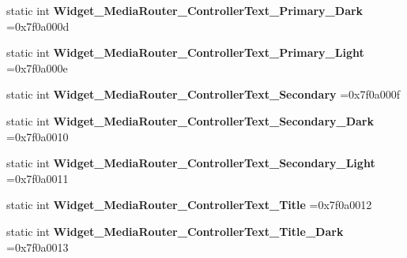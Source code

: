 \begin{DoxyCompactItemize}
\item 
\mbox{\label{classandroid_1_1support_1_1v7_1_1cardview_1_1R_1_1style_a1cf2b189e1316c2f56e93f2bbc734668}} 
static int {\bfseries Widget\+\_\+\+Media\+Router\+\_\+\+Controller\+Text\+\_\+\+Primary\+\_\+\+Dark} =0x7f0a000d
\item 
\mbox{\label{classandroid_1_1support_1_1v7_1_1cardview_1_1R_1_1style_a706d5a6d2ba723b1fabc963287485143}} 
static int {\bfseries Widget\+\_\+\+Media\+Router\+\_\+\+Controller\+Text\+\_\+\+Primary\+\_\+\+Light} =0x7f0a000e
\item 
\mbox{\label{classandroid_1_1support_1_1v7_1_1cardview_1_1R_1_1style_ab57493ccd07e53c02f600a47be8ddde4}} 
static int {\bfseries Widget\+\_\+\+Media\+Router\+\_\+\+Controller\+Text\+\_\+\+Secondary} =0x7f0a000f
\item 
\mbox{\label{classandroid_1_1support_1_1v7_1_1cardview_1_1R_1_1style_acbeb67b82760feaa7bbdbc502a3b2758}} 
static int {\bfseries Widget\+\_\+\+Media\+Router\+\_\+\+Controller\+Text\+\_\+\+Secondary\+\_\+\+Dark} =0x7f0a0010
\item 
\mbox{\label{classandroid_1_1support_1_1v7_1_1cardview_1_1R_1_1style_a3e53e66d7527d064a8c5fef750870936}} 
static int {\bfseries Widget\+\_\+\+Media\+Router\+\_\+\+Controller\+Text\+\_\+\+Secondary\+\_\+\+Light} =0x7f0a0011
\item 
\mbox{\label{classandroid_1_1support_1_1v7_1_1cardview_1_1R_1_1style_a2f218edd012cb8e73a709176e68b12c2}} 
static int {\bfseries Widget\+\_\+\+Media\+Router\+\_\+\+Controller\+Text\+\_\+\+Title} =0x7f0a0012
\item 
\mbox{\label{classandroid_1_1support_1_1v7_1_1cardview_1_1R_1_1style_ab5491b9c80da52017185e87f46365ab5}} 
static int {\bfseries Widget\+\_\+\+Media\+Router\+\_\+\+Controller\+Text\+\_\+\+Title\+\_\+\+Dark} =0x7f0a0013
\item 

\end{DoxyCompactItemize}
